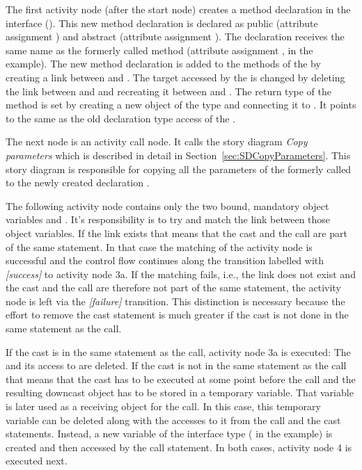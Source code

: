 The first activity node (after the start node) creates a method declaration in the interface (). This new method declaration is declared as public (attribute assignment ) and abstract (attribute assignment ). The declaration receives the same name as the formerly called method (attribute assignment ,  in the example). The new method declaration is added to the methods of the  by creating a  link between  and . The target accessed by the  is changed by deleting the link between  and  and recreating it between  and . The return type of the method is set by creating a new object  of the type  and connecting it to . It points to the same  as the old declaration type access of the .

The next node is an activity call node. It calls the story diagram \emph{Copy parameters} which is described in detail in Section~\ref{sec:SDCopyParameters}. This story diagram is responsible for copying all the parameters of the formerly called  to the newly created declaration .

The following activity node contains only the two bound, mandatory object variables  and . It's responsibility is to try and match the link  between those object variables. If the link exists that means that the cast and the call are part of the same statement. In that case the matching of the activity node is successful and the control flow continues along the transition labelled with \emph{[success]} to activity node 3a. If the matching fails, i.e., the link does not exist and the cast and the call are therefore not part of the same statement, the activity node is left via the \emph{[failure]} transition. This distinction is necessary because the effort to remove the cast statement is much greater if the cast is not done in the same statement as the call.

If the cast is in the same statement as the call, activity node 3a is executed: The  and its access to  are deleted. If the cast is not in the same statement as the call that means that the cast has to be executed at some point before the call and the resulting downcast object has to be stored in a temporary variable. That variable is later used as a receiving object for the call. In this case, this temporary variable can be deleted along with the accesses to it from the call and the cast statements. Instead, a new variable of the interface type ( in the example) is created and then accessed by the call statement. In both cases, activity node 4 is executed next.

